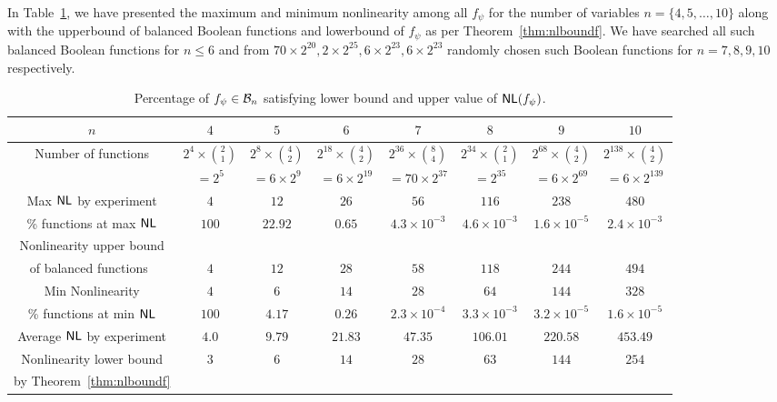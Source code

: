 \documentclass{llncs}
\begin{document}
In Table~\ref{tab:NLminmax}, we have presented the maximum and minimum nonlinearity among all $f_\psi$ for the number of variables $n = \{4, 5, \ldots, 10\}$ along with the upperbound of balanced Boolean functions and lowerbound of $f_{\psi}$ as per Theorem~\ref{thm:nlboundf}. We have searched all such balanced Boolean functions for $n \leq 6$ and from $70 \times 2^{20}, 2 \times 2^{25}, 6 \times 2^{23}, 6 \times 2^{23}$  randomly chosen such Boolean functions for $n = 7,8,9,10$ respectively.
\begin{table}[h!]
\centering
	\renewcommand{\tabcolsep}{2pt}
\begin{tabular}{|c|c|c|c||c|c|c|c|}\hline
$n$ & $4$ & $5$ & $6$ & $7$ & $8$ & $9$ & $10$\\ \hline
Number of functions & $2^4 \times \binom{2}{1}$ & $2^8 \times \binom{4}{2}$ & $2^{18} \times \binom{4}{2}$&$2^{36} \times \binom{8}{4}$&$2^{34} \times \binom{2}{1}$& $2^{68} \times \binom{4}{2}$& $2^{138} \times \binom{4}{2}$\\
& $ = 2^5$& $= 6\times 2^9$& $= 6\times 2^{19}$& $= 70\times 2^{37}$&$ = 2^{35}$&$= 6\times 2^{69}$& $= 6\times 2^{139}$\\ \hline
Max $\mathsf{NL}$ by experiment & $4$ & $12$ & $26$ & $56$ & $116$ & $238$ & $480$\\ \hline
\% functions at max $\mathsf{NL}$ & $100$ & $22.92$ & $0.65$ & $4.3 \times 10^{-3}$ & $4.6 \times 10^{-3}$ & $1.6 \times 10^{-5}$ & $2.4 \times 10^{-3}$\\ \hline
Nonlinearity upper bound & & & & & & &\\
of balanced functions~\cite{SZZ95} & $4$ & $12$ & $28$ & $58$ & $118$ & $244$ & $494$\\ \hline
Min Nonlinearity & $4$ & $6$ & $14$ & $28$ & $64$ & $144$ & $328$\\ \hline
\% functions at min $\mathsf{NL}$ & $100$ & $4.17$ & $0.26$ & $2.3 \times 10^{-4}$ & $3.3 \times 10^{-3}$ & $3.2 \times 10^{-5}$ & $1.6 \times 10^{-5}$\\ \hline
Average $\mathsf{NL}$ by experiment  & $4.0$ & $9.79$ & $21.83$ & $47.35$ & $106.01$  & $220.58$ & $453.49$\\ \hline
Nonlinearity lower bound & $3$ & $6$ & $14$ & $28$ & $63$ & $144$ & $254$\\
by Theorem~\ref{thm:nlboundf} & & & & & & &\\ \hline
\end{tabular}
\caption{Percentage of $f_\psi \in \mathcal{B}_n$ satisfying lower bound and upper value of $\mathsf{NL}(f_\psi)$.\label{tab:NLminmax}}
\end{table}
\end{document}
